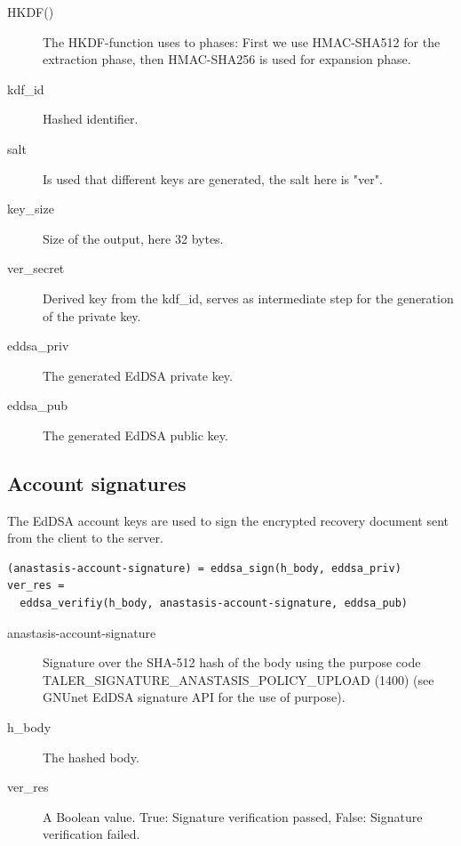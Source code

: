 \begin{description}
	\item[HKDF()] {The HKDF-function uses to phases: First we use HMAC-SHA512 for the extraction phase, then HMAC-SHA256 is used for expansion phase.}
	\item[kdf\_id] {Hashed identifier.}
	\item[salt] {Is used that different keys are generated, the salt here is "ver".}
	\item[key\_size] {Size of the output, here 32 bytes.}
	\item[ver\_secret] {Derived key from the kdf\_id, serves as intermediate step for the generation of the private key.}
\end{description}

\begin{description}
	\item[eddsa\_priv] {The generated EdDSA private key.}
	\item[eddsa\_pub] {The generated EdDSA public key.}
\end{description}


\subsection{Account signatures}

The EdDSA account keys are used to sign the encrypted recovery
document sent from the client to the server.


\begin{lstlisting}
(anastasis-account-signature) = eddsa_sign(h_body, eddsa_priv)
ver_res =
  eddsa_verifiy(h_body, anastasis-account-signature, eddsa_pub)
\end{lstlisting}

\begin{description}
	\item[anastasis-account-signature] {Signature over the SHA-512 hash of the body using the purpose code TALER\_SIGNATURE\_ANASTASIS\_POLICY\_UPLOAD (1400) (see GNUnet EdDSA signature API for the use of purpose).}
	\item[h\_body] {The hashed body.}
	\item[ver\_res] {A Boolean value. True: Signature verification passed, False: Signature verification failed.}
\end{description}

